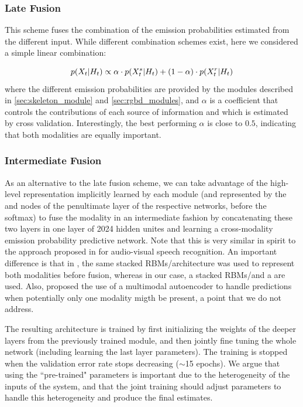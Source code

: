 \subsubsection{Late Fusion}
%
This scheme fuses the combination of the emission probabilities estimated from the different input.
While different combination schemes exist, here we considered a simple linear combination:

\begin{equation}
p(X_t | H_t)  \propto  \alpha \cdot  p(X_t^s | H_t) + (1-\alpha)\cdot  p(X_t^r | H_t)
\end{equation}
where the different emission probabilities are provided by the modules described in \ref{sec:skeleton_module} and \ref{sec:rgbd_modules},
and $\alpha$ is a coefficient that controls the contributions of each source of information and which is estimated by cross validation.
Interestingly, the best performing $\alpha$ is close to $0.5$, indicating that both modalities are equally important.


\subsubsection{Intermediate Fusion}
\label{early_fusion}

As an alternative to the late fusion scheme, we can take advantage of the high-level representation implicitly learned by each module
(and represented by the \highSK and \highRGBD nodes of the penultimate layer of the respective networks, before the softmax)
to fuse the modality in an intermediate fashion by concatenating these two layers in one layer of 2024 hidden unites
and learning a cross-modality emission probability predictive network.
%
Note that this is very similar in spirit to the approach proposed in \cite{Ngiam2011multimodal}
for audio-visual speech recognition.
%
An important difference is that in \cite{Ngiam2011multimodal}, the same stacked RBMs/\DBN architecture was used
to represent both modalities before fusion, whereas in our case, a stacked RBMs/\DBN and a \ThreeDCNN are used.
%
Also, \cite{Ngiam2011multimodal} proposed the use of a multimodal autoencoder to handle predictions when potentially
only one modality migth be present, a point that we do not address.

The resulting architecture is trained by first initializing the weights of the deeper layers from the previously trained module,
and then jointly fine tuning the whole network (including learning the last layer parameters).
The training is stopped when the validation error rate stops decreasing ($\sim$15 epochs).
%
We argue that using the ``pre-trained" parameters is important due to the heterogeneity of the inputs of the system,
and that the joint training should adjust parameters to handle  this heterogeneity and produce the final estimates.



